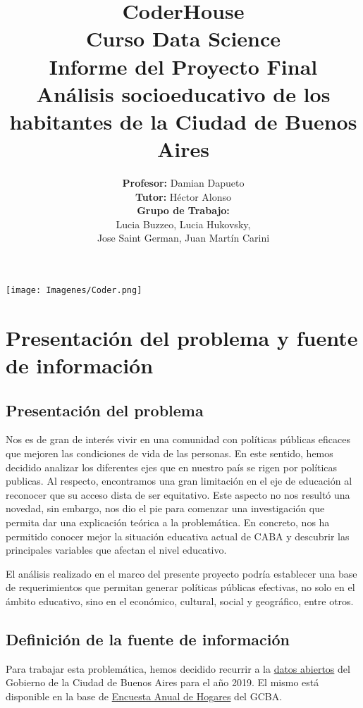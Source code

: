 \documentclass[a4paper]{article}
\title{\textbf{CoderHouse \\ \vspace{0.5cm} Curso Data Science \\ \vspace{0.5cm} Informe del Proyecto Final\\ \vspace{0.5cm}
Análisis socioeducativo de los habitantes de la Ciudad de Buenos Aires}}
\author{\textbf{Profesor:} Damian Dapueto \\ \vspace{0.2cm} \textbf{Tutor:} Héctor Alonso \\ \vspace{0.2cm} \textbf{Grupo de Trabajo:} \\ Lucia Buzzeo, Lucia Hukovsky,\\ Jose Saint German, Juan Martín Carini}
\begin{document}
\maketitle

\begin{center}
    \texttt{[image: Imagenes/Coder.png]}
\end{center}

\thispagestyle{empty}

\newpage

\tableofcontents

\newpage

\section{Presentación del problema y fuente de información}

    \subsection{Presentación del problema}

        Nos es de gran de interés vivir en una comunidad con políticas públicas eficaces que mejoren las condiciones de vida de las personas. En este sentido, hemos decidido analizar los diferentes ejes que en nuestro país se rigen por políticas publicas. Al respecto, encontramos una gran limitación en el eje de educación al reconocer que su acceso dista de ser equitativo. Este aspecto no nos resultó una novedad, sin embargo, nos dio el pie para comenzar una investigación que permita dar una explicación teórica a la problemática. 
        En concreto, nos ha permitido conocer mejor la situación educativa actual de CABA y descubrir las principales variables que afectan el nivel educativo.
        
        El análisis realizado en el marco del presente proyecto podría establecer una base de requerimientos que permitan generar políticas públicas efectivas, no solo en el ámbito educativo, sino en el económico, cultural, social y geográfico, entre otros.

    \subsection{Definición de la fuente de información}

        Para trabajar esta problemática, hemos decidido recurrir a la \href{https://www.estadisticaciudad.gob.ar/eyc/?page_id=702}{datos abiertos} del Gobierno de la Ciudad de Buenos Aires para el año 2019. El mismo está disponible en la base de \href{https://data.buenosaires.gob.ar/dataset/encuesta-anual-hogares/resource/3a45c563-396d-42de-ba93-8a93729e0723}{Encuesta Anual de Hogares} del GCBA.
\end{document}
